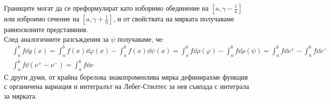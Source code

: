 \documentclass[bulgarian, 12pt]{article}
\begin{document}
Границите могат да се преформулират като изборимо обединение на $[a, \gamma-\frac{1}{n}] $ или изброимо сечение на $[a, \gamma+\frac{1}{n}]$, и от свойствата на мярката получаваме равносилните представяния. \\ След аналогичните разсъждения за $\psi$ получаваме, че:
\begin{align*}\label{eqn:2}
  \tag{2}
  &\int_a^b f \dd g(x) =
  \int_a^b f(x) \dd \varphi(x) - \int_a^b f(x) \dd \psi(x) =
  \int_a^b f \dd \rho(\varphi) - \int_a^b f \dd \rho(\psi) =
  \int_a^b f \dd \nu^+ - \int_a^b f \dd \nu^- \\
  & \int_a^b f \dd (\nu^+ - \nu^-) = \int_a^b f \dd \nu
\end{align*}
С други думи, от крайна борелова знакопроменлива мярка дефинирахме функция с органичена вариация и интегралът на Лебег-Стилтес за нея съвпада с интеграла за мярката.
\end{document}
